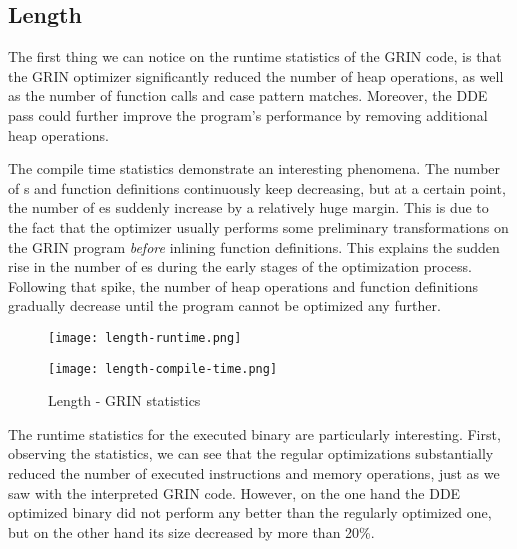 \documentclass[main.tex]{subfiles}
\begin{document}
	
	\subsection{Length}
	
	The first thing we can notice on the runtime statistics of the GRIN code, is that the GRIN optimizer significantly reduced the number of heap operations, as well as the number of function calls and case pattern matches. Moreover, the DDE pass could further improve the program's performance by removing additional heap operations.
	
	The compile time statistics demonstrate an interesting phenomena. The number of s and function definitions continuously keep decreasing, but at a certain point, the number of es suddenly increase by a relatively huge margin. This is due to the fact that the optimizer usually performs some preliminary transformations on the GRIN program \emph{before} inlining function definitions. This explains the sudden rise in the number of es during the early stages of the optimization process. Following that spike, the number of heap operations and function definitions gradually decrease until the program cannot be optimized any further.
	
	\begin{figure}[h]
		\hspace{-0.5cm}
		\renewcommand{\figurename}{Diagram}
		\caption{Length - GRIN statistics}
		\label{diagram:length-stats}
		\addtocounter{figure}{-1}
		\begin{minipage}{0.5\textwidth}
			\label{diagram:length-stats-rt}
			\texttt{[image: length-runtime.png]}
		\end{minipage}
		\begin{minipage}{0.5\textwidth}
			\label{diagram:length-stats-ct}
			\texttt{[image: length-compile-time.png]}
		\end{minipage}
	\end{figure}

	The runtime statistics for the executed binary are particularly interesting. First, observing the  statistics, we can see that the regular optimizations substantially reduced the number of executed instructions and memory operations, just as we saw with the interpreted GRIN code. However, on the one hand the DDE optimized binary did not perform any better than the regularly optimized one, but on the other hand its size decreased by more than 20\%. 
	
\end{document}
